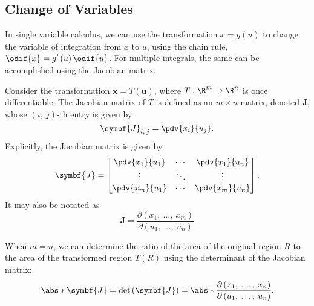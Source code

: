 \documentclass{article}
\begin{document}
\subsection{Change of Variables}
In single variable calculus, we can use the transformation \(x =
g\left( u \right)\) to change the variable of integration from \(x\) to
\(u\), using the chain rule, \(\odif{x} = g'\left( u \right)
\odif{u}\). For multiple integrals, the same can be accomplished using
the Jacobian matrix.
\begin{definition}
    Consider the transformation \(\symbf{x} = T\left( \symbf{u} \right)\),
    where \(T : \R^m \to \R^n\) is once differentiable. The Jacobian
    matrix of \(T\) is defined as an \(m \times n\) matrix, denoted
    \(\symbf{J}\), whose \(\left( i,\: j \right)\)-th entry is given by
    \begin{equation*}
        \symbf{J}_{i,\: j} = \pdv{x_i}{u_j}.
    \end{equation*}
    Explicitly, the Jacobian matrix is given by
    \begin{equation*}
        \symbf{J} =
        \displaystyle
        \begin{bmatrix}
            \displaystyle\pdv{x_1}{u_1} & \displaystyle\cdots & \displaystyle\pdv{x_1}{u_n} \\
            \displaystyle\vdots         & \displaystyle\ddots & \displaystyle\vdots         \\
            \displaystyle\pdv{x_m}{u_1} & \displaystyle\cdots & \displaystyle\pdv{x_m}{u_n} \\
        \end{bmatrix}
        .
    \end{equation*}
    It may also be notated as
    \begin{equation*}
        \symbf{J} = \frac{\partial\left( x_1,\: \ldots,\: x_m \right)}{\partial\left( u_1,\: \ldots,\: u_n \right)}
    \end{equation*}
\end{definition}
\begin{definition}[Jacobian]
    When \(m = n\), we can determine the ratio of the area of the
    original region \(R\) to the area of the transformed region
    \(T\left( R \right)\) using the determinant of the Jacobian matrix:
    \begin{equation*}
        \abs*{\symbf{J}} = \det{\left( \symbf{J} \right)} = \abs*{\frac{\partial\left( x_1,\: \ldots,\: x_n \right)}{\partial\left( u_1,\: \ldots,\: u_n \right)}}.
    \end{equation*}
\end{definition}
\end{document}
